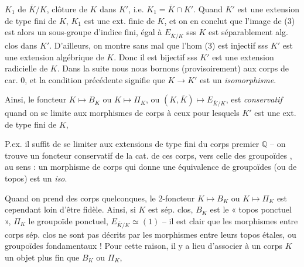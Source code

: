 \documentclass[11pt,a4paper]{article}
\begin{document}


$K_1$ de $\overline{K}/K$, clôture   de $K$ dans $K'$, i.e. $K_1 = \overline{K} \cap K'$. Quand $K'$ est une extension de type fini de $K$, $K_1$ est une ext. finie de $K$, et on en conclut que l'image de (3) est alors un sous-groupe d'indice fini, égal à $E_{\overline{K}/K}$ sss  $K$ est séparablement alg. clos dans $K'$. D'ailleurs, on montre sans mal que  l'hom (3) est injectif sss $K'$ est une extension algébrique de $K$. Donc il est bijectif sss $K'$ est une extension radicielle de $K$. Dans la suite nous nous bornons (provisoirement) aux corps de car. 0, et la condition précédente signifie  que $K \to K'$ est un \emph{isomorphisme}.

Ainsi, le foncteur $K \mapsto B_K$ ou $K \mapsto \Pi_K$, ou $(K, \overline{K}) \mapsto E_{\overline{K}/K}$, est \emph{conservatif} quand on se limite aux morphismes de corps  à ceux pour lesquels $K'$ est une ext. de type fini de $K$,

P.ex. il suffit de se limiter aux extensions de type fini du corps premier $\mathbb{Q}$ -- on trouve un foncteur conservatif de la cat. de ces corps, vers celle des groupoïdes , au sens : un morphisme de corps qui donne une équivalence de groupoïdes (ou de topos) est un \emph{iso}.


Quand on prend des corps quelconques, le 2-foncteur $K \mapsto B_K$ ou $K \mapsto \Pi_K$  est cependant loin d'être fidèle. Ainsi, si $K$ est sép. clos, $B_K$ est le « topos ponctuel », $\Pi_K$ le groupoïde ponctuel, $E_{\overline{K}/K} \simeq (1)$ -- il est clair que les morphismes entre corps sép. clos ne sont pas décrits par les morphismes entre leurs topos étales, ou groupoïdes fondamentaux ! Pour cette raison, il y a lieu d'associer à un corps $K$ un objet plus fin que $B_K$ ou $\Pi_K$,
\end{document}
